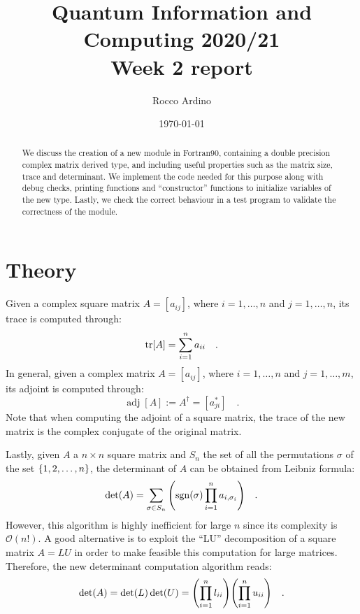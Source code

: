 \documentclass[pra, onecolumn, notitlepage, floats, 11pt]{revtex4-1}
\begin{document}
\title{Quantum Information and Computing 2020/21\\Week 2 report}

\author{Rocco Ardino}

\date{\today}





\begin{abstract}
We discuss the creation of a new module in Fortran90, containing a double precision complex matrix derived type, and including useful properties such as the matrix size, trace and determinant. We implement the code needed for this purpose along with debug checks, printing functions and ``constructor'' functions to initialize variables of the new type. Lastly, we check the correct behaviour in a test program to validate the correctness of the module.
\end{abstract}

\maketitle


\section{Theory}
Given a complex square matrix \( A = [a_{ij}] \), where \( i=1,\dots,n \) and \( j=1,\dots,n \), its trace is computed through:
\begin{equation}
    \tr[A]
    =
    \sum_{i=1}^{n} a_{ii}
    \quad.
    \label{eq:02_T_TR}
\end{equation}
In general, given a complex matrix \( A = [a_{ij}] \), where \( i=1,\dots,n \) and \( j=1,\dots,m \), its adjoint is computed through:
\begin{equation}
    \operatorname{adj}[A]
    :=
    A^{\dag}
    =
    [a^*_{ji}]
    \quad.
    \label{eq:02_T_ADJ}
\end{equation}
Note that when computing the adjoint of a square matrix, the trace of the new matrix is the complex conjugate of the original matrix.

Lastly, given \( A \) a \( n \times n \) square matrix and \( S_n \) the set of all the permutations \( \sigma \) of the set \( \qty{1,2,\dots,n} \), the determinant of \( A \) can be obtained from Leibniz formula:
\begin{equation}
    \det(A)
    =
    \sum_{\sigma \in S_n}^{} \qty(\operatorname{sgn}(\sigma) \prod_{i=1}^{n} a_{i,\sigma_i})
    \quad.
    \label{eq:02_T_DET}
\end{equation}
However, this algorithm is highly inefficient for large \( n \) since its complexity is \( \mathcal{O}(n!) \). A good alternative is to exploit the ``LU'' decomposition of a square matrix \( A = LU \) in order to make feasible this computation for large matrices. Therefore, the new determinant computation algorithm reads:
\begin{equation}
    \det(A)
    =
    \det(L) \det(U)
    =
    \qty(\prod_{i=1}^{n} l_{ii}) \qty(\prod_{i=1}^{n} u_{ii})
    \quad.
    \label{eq:02_T_DET_LU}
\end{equation}
\end{document}
